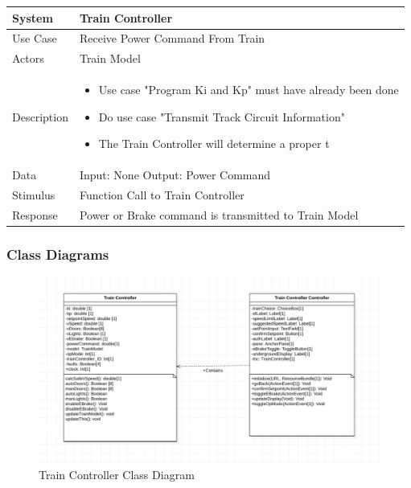 \documentclass{article}
\begin{document}
    \begin{longtable}{
    || >{\raggedright\arraybackslash}m{}
    | >{\raggedright\arraybackslash}m{}||}
    \hline
    \textbf{System} & \textbf{Train Controller} \\
    \hline
    Use Case & Receive Power Command From Train\\
    \hline
    Actors & Train Model\\
    \hline
    Description & \begin{itemize}
        \item Use case "Program Ki and Kp" must have already been done
        \item Do use case "Transmit Track Circuit Information"
        \item The Train Controller will determine a proper t
    \end{itemize}\\
    \hline
    Data & Input: None \newline Output: Power Command\\
    \hline
    Stimulus & Function Call to Train Controller\\
    \hline
    Response & Power or Brake command is transmitted to Train Model\\
    \hline
    \end{longtable}
    
    
    \subsubsection{Class Diagrams}
    \begin{figure}[H]
        \centering
        \includegraphics[width=\textwidth]{./ClassDiagrams/TNCCD.png}
        \caption{Train Controller Class Diagram}
        \label{fig:Train Controler Class Diagram}
    \end{figure}
    
\end{document}

